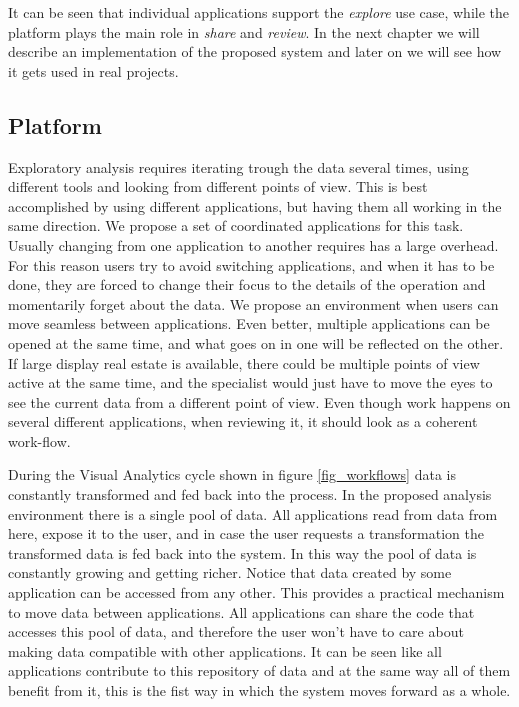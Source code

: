 It can be seen that individual applications support the \emph{explore} use case, while the platform plays the main role in \emph{share} and \emph{review}. In the next chapter we will describe an implementation of the proposed system and later on we will see how it gets used in real projects.

\subsection{Platform}

Exploratory analysis requires iterating trough the data several times, using different tools and looking from different points of view. This is best accomplished by using different applications, but having them all working in the same direction. We propose a set of coordinated applications for this task. Usually changing from one application to another requires has a large overhead. For this reason users try to avoid switching applications, and when it has to be done, they are forced to change their focus to the details of the operation and momentarily forget about the data. We propose an environment when users can move seamless between applications. Even better, multiple applications can be opened at the same time, and what goes on in one will be reflected on the other. If large display real estate is available, there could be multiple points of view active at the same time, and the specialist would just have to move the eyes to see the current data from a different point of view. Even though work happens on several different applications, when reviewing it, it should look as a coherent work-flow. 

During the Visual Analytics cycle shown in figure \ref{fig_workflows} data is constantly transformed and fed back into the process. In the proposed analysis environment there is a single pool of data. All applications read from data from here, expose it to the user, and in case the user requests a transformation the transformed data is fed back into the system. In this way the pool of data is constantly growing and getting richer. Notice that data created by some application can be accessed from any other. This provides a practical mechanism to move data between applications. All applications can share the code that accesses this pool of data, and therefore the user won't have to care about making data compatible with other applications. It can be seen like all applications contribute to this repository of data and at the same way all of them benefit from it, this is the fist way in which the system moves forward as a whole.

